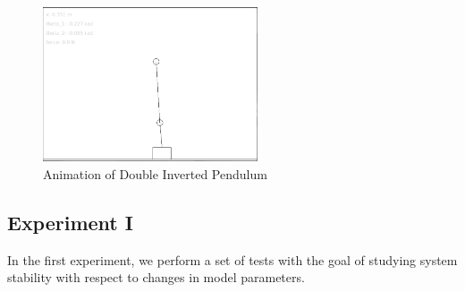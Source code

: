 \documentclass[journal]{IEEEtran}
\begin{document}
\begin{figure}[!t]
    \centering
    \includegraphics[width=2.5in]{fig_000_anim.png}
    \caption{Animation of Double Inverted Pendulum}
    \label{fig_000_anim}
\end{figure}


\subsection{Experiment I}
In the first experiment, we perform a set of tests with the goal of studying
system stability with respect to changes in model parameters.








%



\end{document}
